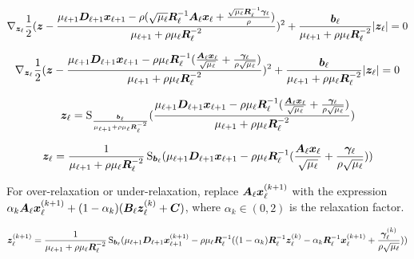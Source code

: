 \begin{equation}
\nabla_{\bm{z}_{\ell}} \frac{1}{2}(\bm{z} -\frac{\mu_{\ell + 1}\bm{D}_{\ell + 1}\bm{x}_{\ell + 1} - \rho(\sqrt{\mu_{\ell}}\bm{R}_{\ell}^{-1}\bm{A}_{\ell}\bm{x}_{\ell} + \frac{\sqrt{\mu_{\ell}}\bm{R}_{\ell}^{-1}\bm{\gamma}_{\ell}}{\rho})}{\mu_{\ell + 1} + \rho\mu_{\ell}\bm{R}_{\ell}^{-2}})^2 + \frac{\bm{b}_{\ell}}{\mu_{\ell + 1} + \rho\mu_{\ell}\bm{R}_{\ell}^{-2}}|\bm{z}_{\ell}| = 0
\end{equation}

\begin{equation}
\nabla_{\bm{z}_{\ell}} \frac{1}{2}(\bm{z} -\frac{\mu_{\ell + 1}\bm{D}_{\ell + 1}\bm{x}_{\ell + 1} - \rho\mu_{\ell}\bm{R}_{\ell}^{-1}(\frac{\bm{A}_{\ell}\bm{x}_{\ell}}{\sqrt{\mu_{\ell}}} + \frac{\bm{\gamma}_{\ell}}{\rho\sqrt{\mu_{\ell}}})}{\mu_{\ell + 1} + \rho\mu_{\ell}\bm{R}_{\ell}^{-2}})^2 + \frac{\bm{b}_{\ell}}{\mu_{\ell + 1} + \rho\mu_{\ell}\bm{R}_{\ell}^{-2}}|\bm{z}_{\ell}| = 0
\end{equation}

\begin{equation}
\bm{z}_{\ell} = \operatorname{S}_{\frac{\bm{b}_{\ell}}{\mu_{\ell + 1} + \rho\mu_{\ell}\bm{R}_{\ell}^{-2}}}(\frac{\mu_{\ell + 1}\bm{D}_{\ell + 1}\bm{x}_{\ell + 1} - \rho\mu_{\ell}\bm{R}_{\ell}^{-1}(\frac{\bm{A}_{\ell}\bm{x}_{\ell}}{\sqrt{\mu_{\ell}}} + \frac{\bm{\gamma}_{\ell}}{\rho\sqrt{\mu_{\ell}}})}{\mu_{\ell + 1} + \rho\mu_{\ell}\bm{R}_{\ell}^{-2}})
\end{equation}

\begin{equation}
\bm{z}_{\ell} = \frac{1}{\mu_{\ell + 1} + \rho\mu_{\ell}\bm{R}_{\ell}^{-2}}\operatorname{S}_{\bm{b}_{\ell}}(\mu_{\ell + 1}\bm{D}_{\ell + 1}\bm{x}_{\ell + 1} - \rho\mu_{\ell}\bm{R}_{\ell}^{-1}(\frac{\bm{A}_{\ell}\bm{x}_{\ell}}{\sqrt{\mu_{\ell}}} + \frac{\bm{\gamma}_{\ell}}{\rho\sqrt{\mu_{\ell}}}))
\end{equation}

For over-relaxation or under-relaxation, replace $\bm{A}_{\ell}\bm{x}_{\ell}^{(k + 1)}$ with the expression $\alpha_k\bm{A}_{\ell}\bm{x}_{\ell}^{(k + 1)} + (1 - \alpha_k)(\bm{B}_{\ell}\bm{z}_{\ell}^{(k)} + \bm{C})$, where $\alpha_k \in (0,2)$ is the relaxation factor.

\begin{equation}
\bm{z}_{\ell}^{(k + 1)} = \frac{1}{\mu_{\ell + 1} + \rho\mu_{\ell}\bm{R}_{\ell}^{-2}}\operatorname{S}_{\bm{b}_{\ell}}(\mu_{\ell + 1}\bm{D}_{\ell + 1}\bm{x}_{\ell + 1}^{(k + 1)} - \rho\mu_{\ell}\bm{R}_{\ell}^{-1}((1 - \alpha_k)\bm{R}_{\ell}^{-1}\bm{z}_{\ell}^{(k)} - \alpha_k\bm{R}_{\ell}^{-1}\bm{x}_{\ell}^{(k + 1)} + \frac{\bm{\gamma}_{\ell}^{(k)}}{\rho\sqrt{\mu_{\ell}}}))
\end{equation}

